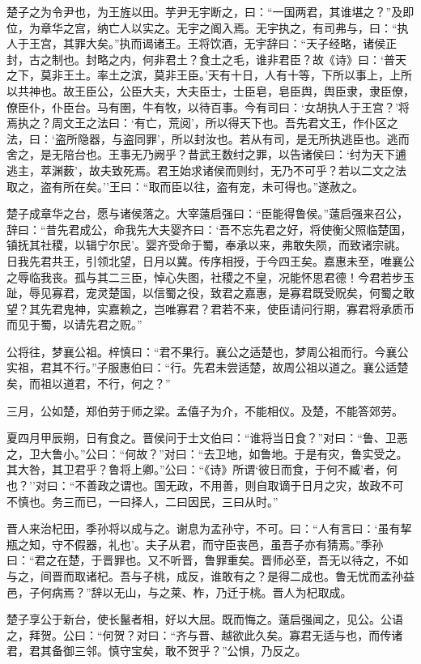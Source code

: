 \documentclass[]{article}
\begin{document}
楚子之为令尹也，为王旌以田。芋尹无宇断之，曰：``一国两君，其谁堪之？''及即位，为章华之宫，纳亡人以实之。无宇之阍入焉。无宇执之，有司弗与，曰：``执人于王宫，其罪大矣。''执而谒诸王。王将饮酒，无宇辞曰：``天子经略，诸侯正封，古之制也。封略之内，何非君土？食土之毛，谁非君臣？故《诗》曰：`普天之下，莫非王土。率土之滨，莫非王臣。'天有十日，人有十等，下所以事上，上所以共神也。故王臣公，公臣大夫，大夫臣士，士臣皂，皂臣舆，舆臣隶，隶臣僚，僚臣仆，仆臣台。马有圉，牛有牧，以待百事。今有司曰：`女胡执人于王宫？'将焉执之？周文王之法曰：`有亡，荒阅'，所以得天下也。吾先君文王，作仆区之法，曰：`盗所隐器，与盗同罪'，所以封汝也。若从有司，是无所执逃臣也。逃而舍之，是无陪台也。王事无乃阙乎？昔武王数纣之罪，以告诸侯曰：`纣为天下逋逃主，萃渊薮'，故夫致死焉。君王始求诸侯而则纣，无乃不可乎？若以二文之法取之，盗有所在矣。''王曰：``取而臣以往，盗有宠，未可得也。''遂赦之。

楚子成章华之台，愿与诸侯落之。大宰薳启强曰：``臣能得鲁侯。''薳启强来召公，辞曰：``昔先君成公，命我先大夫婴齐曰：`吾不忘先君之好，将使衡父照临楚国，镇抚其社稷，以辑宁尔民'。婴齐受命于蜀，奉承以来，弗敢失陨，而致诸宗祧。日我先君共王，引领北望，日月以冀。传序相授，于今四王矣。嘉惠未至，唯襄公之辱临我丧。孤与其二三臣，悼心失图，社稷之不皇，况能怀思君德！今君若步玉趾，辱见寡君，宠灵楚国，以信蜀之役，致君之嘉惠，是寡君既受贶矣，何蜀之敢望？其先君鬼神，实嘉赖之，岂唯寡君？君若不来，使臣请问行期，寡君将承质币而见于蜀，以请先君之贶。''

公将往，梦襄公祖。梓慎曰：``君不果行。襄公之适楚也，梦周公祖而行。今襄公实祖，君其不行。''子服惠伯曰：``行。先君未尝适楚，故周公祖以道之。襄公适楚矣，而祖以道君，不行，何之？''

三月，公如楚，郑伯劳于师之梁。孟僖子为介，不能相仪。及楚，不能答郊劳。

夏四月甲辰朔，日有食之。晋侯问于士文伯曰：``谁将当日食？''对曰：``鲁、卫恶之，卫大鲁小。''公曰：``何故？''对曰：``去卫地，如鲁地。于是有灾，鲁实受之。其大咎，其卫君乎？鲁将上卿。''公曰：``《诗》所谓`彼日而食，于何不臧'者，何也？''对曰：``不善政之谓也。国无政，不用善，则自取谪于日月之灾，故政不可不慎也。务三而已，一曰择人，二曰因民，三曰从时。''

晋人来治杞田，季孙将以成与之。谢息为孟孙守，不可。曰：``人有言曰：`虽有挈瓶之知，守不假器，礼也'。夫子从君，而守臣丧邑，虽吾子亦有猜焉。''季孙曰：``君之在楚，于晋罪也。又不听晋，鲁罪重矣。晋师必至，吾无以待之，不如与之，间晋而取诸杞。吾与子桃，成反，谁敢有之？是得二成也。鲁无忧而孟孙益邑，子何病焉？''辞以无山，与之莱、柞，乃迁于桃。晋人为杞取成。

楚子享公于新台，使长鬣者相，好以大屈。既而悔之。薳启强闻之，见公。公语之，拜贺。公曰：``何贺？对曰：``齐与晋、越欲此久矣。寡君无适与也，而传诸君，君其备御三邻。慎守宝矣，敢不贺乎？''公惧，乃反之。
\end{document}
